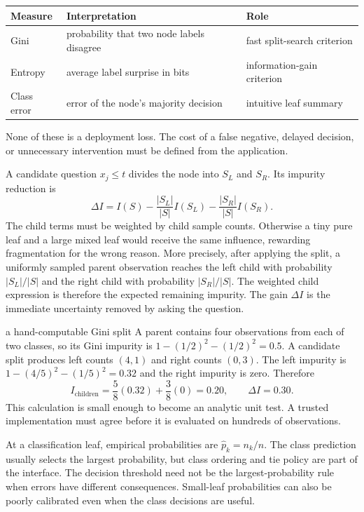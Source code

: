 \begin{center}
\begin{tabularx}{0.94\textwidth}{@{}lXX@{}}
\toprule
Measure & Interpretation & Role \\
\midrule
Gini & probability that two node labels disagree & fast split-search criterion \\
Entropy & average label surprise in bits & information-gain criterion \\
Class error & error of the node's majority decision & intuitive leaf summary \\
\bottomrule
\end{tabularx}
\end{center}

None of these is a deployment loss. The cost of a false negative, delayed
decision, or unnecessary intervention must be defined from the application.

A candidate question $x_j\le t$ divides the node into $S_L$ and $S_R$. Its
impurity reduction is
\[
  \Delta I
  = I(S)-\frac{|S_L|}{|S|}I(S_L)-\frac{|S_R|}{|S|}I(S_R).
\]
The child terms must be weighted by child sample counts. Otherwise a tiny pure
leaf and a large mixed leaf would receive the same influence, rewarding
fragmentation for the wrong reason. More precisely, after applying the split,
a uniformly sampled parent observation reaches the left child with probability
$|S_L|/|S|$ and the right child with probability $|S_R|/|S|$. The weighted
child expression is therefore the expected remaining impurity. The gain
$\Delta I$ is the immediate uncertainty removed by asking the question.

\begin{workedexample}{a hand-computable Gini split}
A parent contains four observations from each of two classes, so its Gini
impurity is $1-(1/2)^2-(1/2)^2=0.5$. A candidate split produces left counts
$(4,1)$ and right counts $(0,3)$. The left impurity is
$1-(4/5)^2-(1/5)^2=0.32$ and the right impurity is zero. Therefore
\[
  I_{\mathrm{children}}
  =\frac{5}{8}(0.32)+\frac{3}{8}(0)=0.20,
  \qquad \Delta I=0.30.
\]
This calculation is small enough to become an analytic unit test. A trusted
implementation must agree before it is evaluated on hundreds of observations.
\end{workedexample}

At a classification leaf, empirical probabilities are
$\widehat p_k=n_k/n$. The class prediction usually selects the largest
probability, but class ordering and tie policy are part of the interface. The
decision threshold need not be the largest-probability rule when errors have
different consequences. Small-leaf probabilities can also be poorly
calibrated even when the class decisions are useful.

